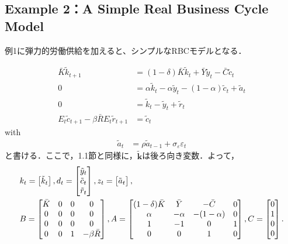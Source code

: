 \documentclass[a4j, dvipdfmx]{jarticle}
\begin{document}
\subsection{Example 2：A Simple Real Business Cycle Model}

例1に弾力的労働供給を加えると、シンプルなRBCモデルとなる．

\begin{align}
\bar K \tilde k_{t+1} &= (1-\delta) \bar K \tilde k_t  + \bar Y \tilde y_t - \bar C \tilde c_t\label{rbc1}\\
0 &= \alpha \tilde k_t -\alpha \tilde y_t - (1-\alpha) \tilde c_t + \tilde a_t\label{rbc3}\\
0 &= \tilde k_t - \tilde y_t + \tilde r_t\label{rbc4}\\
E_t\tilde c_{t+1} - \beta \bar R E_t \tilde r_{t+1} &= \tilde c_t\label{rbc5}
\end{align}
with
\begin{align*}
\tilde a_t &= \rho \tilde a_{t-1} + \sigma_\varepsilon \varepsilon_t\label{rbc2}
\end{align*}
と書ける．ここで，1.1節と同様に，$\boldsymbol{\tilde k}$は後ろ向き変数．よって，
\begin{align}
&k_t = \begin{bmatrix}\tilde k_t\end{bmatrix}, d_t = \begin{bmatrix}\tilde y_t \\ \tilde c_t \\ \tilde r_t\end{bmatrix}, z_t = \begin{bmatrix}\tilde a_t\end{bmatrix},\notag\\
&B = \begin{bmatrix}\bar K & 0 & 0 & 0\\
0 & 0 & 0 & 0\\
0 & 0 & 0 & 0\\
0 & 0 & 1 & -\beta \bar R\end{bmatrix},
A = \begin{bmatrix}(1-\delta) \bar K & \bar Y & -\bar C & 0\\
\alpha & -\alpha & -(1-\alpha) & 0\\
1 & -1 & 0 & 1\\
0 & 0 & 1 & 0\end{bmatrix},
C = \begin{bmatrix}0 \\ 1 \\ 0 \\ 0\end{bmatrix}.
\end{align}
\end{document}

